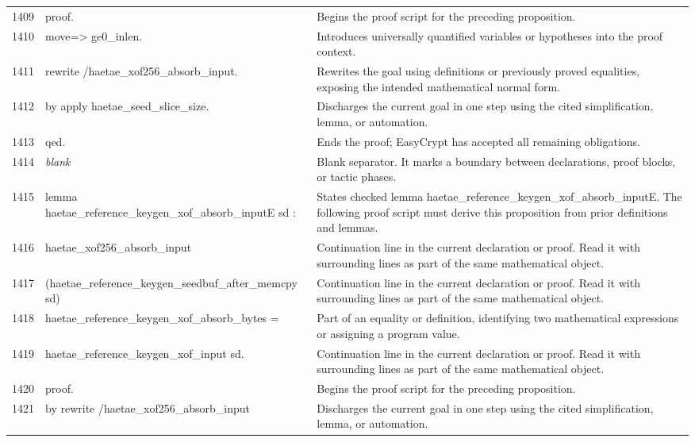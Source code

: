 \documentclass[10pt]{article}
\begin{document}
\begin{longtable}{r L{0.53\textwidth} L{0.37\textwidth}}
1409 & {\ttfamily\scriptsize proof.} & Begins the proof script for the preceding proposition. \\
1410 & {\ttfamily\scriptsize move=> ge0\_inlen.} & Introduces universally quantified variables or hypotheses into the proof context. \\
1411 & {\ttfamily\scriptsize rewrite /haetae\_xof256\_absorb\_input.} & Rewrites the goal using definitions or previously proved equalities, exposing the intended mathematical normal form. \\
1412 & {\ttfamily\scriptsize by apply haetae\_seed\_slice\_size.} & Discharges the current goal in one step using the cited simplification, lemma, or automation. \\
1413 & {\ttfamily\scriptsize qed.} & Ends the proof; EasyCrypt has accepted all remaining obligations. \\
1414 & {\ttfamily\scriptsize \emph{blank}} & Blank separator.  It marks a boundary between declarations, proof blocks, or tactic phases. \\
1415 & {\ttfamily\scriptsize lemma haetae\_reference\_keygen\_xof\_absorb\_inputE sd :} & States checked lemma haetae\_reference\_keygen\_xof\_absorb\_inputE.  The following proof script must derive this proposition from prior definitions and lemmas. \\
1416 & {\ttfamily\scriptsize   haetae\_xof256\_absorb\_input} & Continuation line in the current declaration or proof.  Read it with surrounding lines as part of the same mathematical object. \\
1417 & {\ttfamily\scriptsize     (haetae\_reference\_keygen\_seedbuf\_after\_memcpy sd)} & Continuation line in the current declaration or proof.  Read it with surrounding lines as part of the same mathematical object. \\
1418 & {\ttfamily\scriptsize     haetae\_reference\_keygen\_xof\_absorb\_bytes =} & Part of an equality or definition, identifying two mathematical expressions or assigning a program value. \\
1419 & {\ttfamily\scriptsize   haetae\_reference\_keygen\_xof\_input sd.} & Continuation line in the current declaration or proof.  Read it with surrounding lines as part of the same mathematical object. \\
1420 & {\ttfamily\scriptsize proof.} & Begins the proof script for the preceding proposition. \\
1421 & {\ttfamily\scriptsize by rewrite /haetae\_xof256\_absorb\_input} & Discharges the current goal in one step using the cited simplification, lemma, or automation. \\

\end{longtable}
\end{document}
